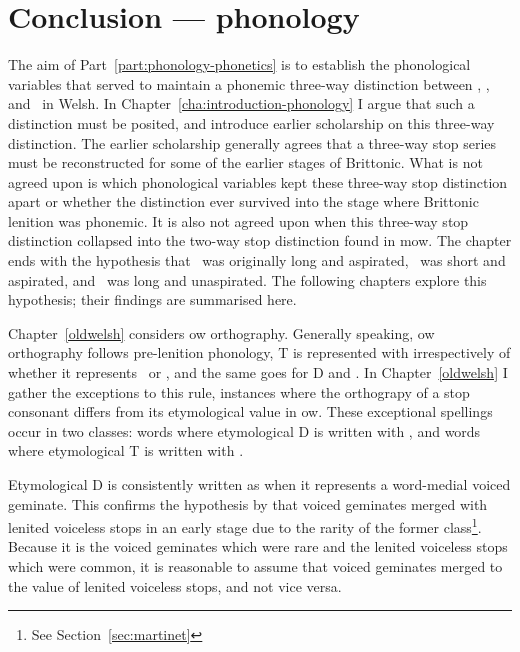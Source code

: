\chapter{Conclusion --- phonology}
\label{cha:conclusion-phonology}

The aim of Part~\ref{part:phonology-phonetics} is to establish the phonological variables that served to maintain a phonemic three-way distinction between \xT, \lT, and \xD\ in Welsh. In Chapter~\ref{cha:introduction-phonology} I argue that such a distinction must be posited, and introduce earlier scholarship on this three-way distinction. The earlier scholarship generally agrees that a three-way stop series must be reconstructed for some of the earlier stages of Brittonic. What is not agreed upon is which phonological variables kept these three-way stop distinction apart or whether the distinction ever survived into the stage where Brittonic lenition was phonemic. It is also not agreed upon when this three-way stop distinction collapsed into the two-way stop distinction found in \gls{mow}. The chapter ends with the hypothesis that \xT\ was originally long and aspirated, \lT\ was short and aspirated, and \xD\ was long and unaspirated. The following chapters explore this hypothesis; their findings are summarised here.

Chapter~\ref{oldwelsh} considers \gls{ow} orthography. Generally speaking, \gls{ow} orthography follows pre-lenition phonology, \ie \gls{T} is represented with  irrespectively of whether it represents \lT\ or \xT, and the same goes for \gls{D} and . In Chapter~\ref{oldwelsh} I gather the exceptions to this rule, \ie instances where the orthograpy of a stop consonant differs from its etymological value in \gls{ow}. These exceptional spellings occur in two classes: words where etymological  \gls{D} is written with , and words where etymological \gls{T} is written with .

Etymological \gls{D} is consistently written as  when it represents a word-medial voiced geminate. This confirms the hypothesis by \textcite{martinet_celtic_1952} that voiced geminates merged with lenited voiceless stops in an early stage due to the rarity of the former class\footnote{See Section~\ref{sec:martinet}}. Because it is the voiced geminates which were rare and the lenited voiceless stops which were common, it is reasonable to assume that voiced geminates merged to the value of lenited voiceless stops, and not vice versa.

